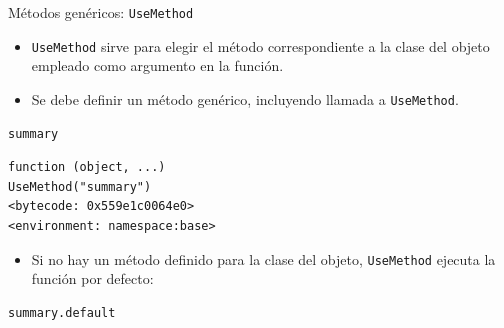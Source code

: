 \documentclass[xcolor={usenames,svgnames,dvipsnames}]{beamer}
\begin{document}
\begin{frame}[fragile,label={sec:org88f9d2c}]{Métodos genéricos: \texttt{UseMethod}}
 \begin{itemize}
\item \texttt{UseMethod} sirve para elegir el método correspondiente a la clase
del objeto empleado como argumento en la función.

\item Se debe definir un método genérico, incluyendo llamada a
\texttt{UseMethod}.
\end{itemize}
\lstset{language=r,label= ,caption= ,captionpos=b,numbers=none}
\begin{lstlisting}
summary
\end{lstlisting}

\begin{verbatim}
function (object, ...) 
UseMethod("summary")
<bytecode: 0x559e1c0064e0>
<environment: namespace:base>
\end{verbatim}

\begin{itemize}
\item Si no hay un método definido para la clase del objeto, \texttt{UseMethod} ejecuta la función por defecto:
\end{itemize}
\lstset{language=r,label= ,caption= ,captionpos=b,numbers=none}
\begin{lstlisting}
summary.default
\end{lstlisting}


\end{frame}
\end{document}
